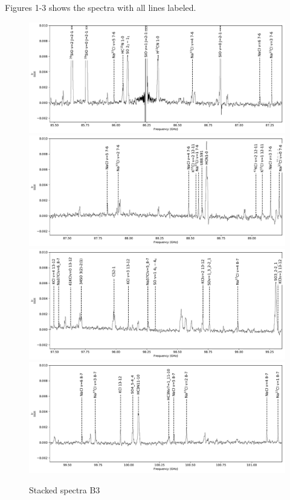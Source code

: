 \documentclass[twocolumn]{aastex62}
\begin{document}
Figures 1-3 shows the spectra with all lines labeled.

\begin{figure}[!htp]
\includegraphics[scale=1,width=6in]{figures/lines_labeled_OrionSourceI_B3_spw0_robust0.5.pdf}
\includegraphics[scale=1,width=6in]{figures/lines_labeled_OrionSourceI_B3_spw1_robust0.5.pdf}
\includegraphics[scale=1,width=6in]{figures/lines_labeled_OrionSourceI_B3_spw2_robust0.5.pdf}
\includegraphics[scale=1,width=6in]{figures/lines_labeled_OrionSourceI_B3_spw3_robust0.5.pdf}
\caption{Stacked spectra  B3}
\label{fig:spectrab3}
\end{figure}
\end{document}
